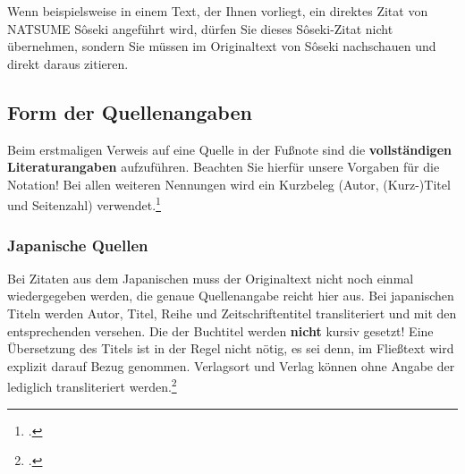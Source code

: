 \documentclass{japo}
\begin{document}
Wenn beispielsweise in einem Text, der Ihnen vorliegt, ein direktes Zitat von NATSUME Sôseki angeführt wird, dürfen Sie dieses Sôseki-Zitat nicht übernehmen, sondern Sie müssen im Originaltext von Sôseki nachschauen und direkt daraus zitieren.

\subsection{Form der Quellenangaben}
Beim erstmaligen Verweis auf eine Quelle in der Fußnote sind die \textbf{vollständigen Literaturangaben} aufzuführen. Beachten Sie hierfür unsere Vorgaben für die Notation! Bei allen weiteren Nennungen wird ein Kurzbeleg (Autor, (Kurz-)Titel und Seitenzahl) verwendet.\footcite[10]{muster:quellen}

\subsubsection{Japanische Quellen}
Bei Zitaten aus dem Japanischen muss der Originaltext nicht noch einmal wiedergegeben werden, die genaue Quellenangabe reicht hier aus. Bei japanischen Titeln werden Autor, Titel, Reihe und Zeitschriftentitel transliteriert und mit den entsprechenden  versehen. Die  der Buchtitel werden \textbf{nicht} kursiv gesetzt! Eine Übersetzung des Titels ist in der Regel nicht nötig, es sei denn, im Fließtext wird explizit darauf Bezug genommen. Verlagsort und Verlag können ohne Angabe der  lediglich transliteriert werden.\footcite[112]{suzuki:ronbun}

\printbibliography
\end{document}
